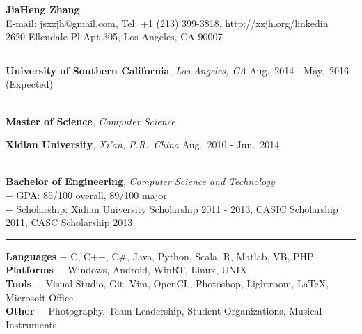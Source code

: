 \documentclass[a4paper,10pt]{article}
\newcommand{\shadedsection}[1]{
    \setlength{\fboxsep}{0pt}
    \colorbox{shadecolor}{%
        \begin{minipage}{\linewidth}%
            \vspace{0.2em}%
            #1%
        \end{minipage}%
    }
}
\newenvironment{rSection}[1]{ %
  \medskip
  \hspace{-1.5em}{\color{Blue}\MakeUppercase{\large \bf {#1}}} %
  \vspace{-0.2em}
  \medskip
  \hrule %
  \begin{list}{}{ %
    \setlength{\leftmargin}{1.5em} %
  }
\setlength{\itemsep}{1pt}
  \item[]
}{
  \end{list}
}
\newcommand{\detail}[1]{{$-$ {#1}}}
\newcommand{\period}[3]{\normalsize {#1} \hfill {#2} - {#3}}
\newcommand{\skill}[2]{{\bf #1} \detail{{#2}}}
\begin{document}
\begin{center}
  {\huge \bf \color{Blue} JiaHeng Zhang}\\
  \medskip
  {E-mail: jsxzjh@gmail.com, Tel: +1 (213) 399-3818, http://xzjh.org/linkedin}\\
  \smallskip
  {2620 Ellendale Pl Apt 305, Los Angeles, CA 90007}
\end{center}

\begin{rSection}{Education}
  \vspace{-1.5em}
  \item
    \shadedsection{\period{{\bf University of Southern California}, {\em Los Angeles, CA}}{Aug.~2014}{May.~2016 (Expected)}}\\
    {\bf Master of Science}, {\em Computer Science}
  \item
    \shadedsection{\period{{\bf Xidian University}, {\em Xi'an, P.R.~China}}{Aug.~2010}{Jun.~2014}}\\
    {\bf Bachelor of Engineering}, {\em Computer Science and Technology}\\
    \detail{GPA: 85/100 overall, 89/100 major}\\
    \detail{Scholarship: Xidian University Scholarship 2011 - 2013, CASIC Scholarship 2011, CASC Scholarship 2013}
\end{rSection}

\vspace{-0.5em}

\begin{rSection}{Skills}
  \vspace{-1.5em}
  \item
\skill{Languages}{C, C++, C\#, Java, Python, Scala, R, Matlab, VB, PHP}\\
\skill{Platforms}{Windows, Android, WinRT, Linux, UNIX}\\
\skill{Tools}{Visual Studio, Git, Vim, OpenCL, Photoshop, Lightroom, \LaTeX, Microsoft Office}\\
\skill{Other}{Photography, Team Leadership, Student Organizations, Musical Instruments}
\end{rSection}

\vspace{-0.5em}
\end{document}
